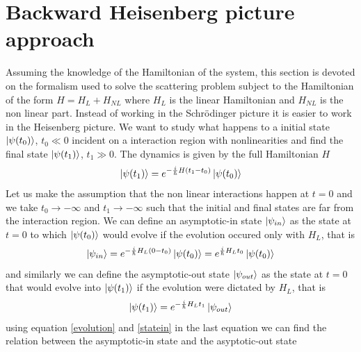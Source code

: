 \documentclass[12pt]{book}
\begin{document}
\section{Backward Heisenberg picture approach}\label{heinsemberg}
Assuming the knowledge of the Hamiltonian of the system, this section is devoted on the formalism used to solve the scattering problem subject to the Hamiltonian of the form $H = H_L +H_{NL}$ where $H_L$ is the linear Hamiltonian and $H_{NL}$ is the non linear part. Instead of working in the Schr{\"o}dinger picture it is easier to work in the Heisenberg picture. 
We want to study what happens to a initial state $\ket{\psi(t_0)}$, $t_0\ll 0$ incident on a interaction region with nonlinearities and find the final state $\ket{\psi(t_1)}$, $t_1\gg 0$. The dynamics is given by the full Hamiltonian $H$
\begin{equation}\label{evolution}\ket{\psi(t_1)} = e^{-\frac{i}{\hbar}H (t_1-t_0)}\ket{\psi(t_0)}\end{equation}
Let us make the assumption that the non linear interactions happen at $t=0$ and we take $t_0 \to -\infty$ and $t_1 \to -\infty$ such that the initial and final states are far from the interaction region. We can define an asymptotic-in state $\ket{\psi_{in}}$ as the state at $t=0$ to which $\ket{\psi(t_0)}$ would evolve if the evolution occured only with $H_L$, that is
\begin{equation}\label{statein}\ket{\psi_{in}} = e^{-\frac{i}{\hbar}H_L (0-t_0)}\ket{\psi(t_0)} = e^{\frac{i}{\hbar}H_Lt_0}\ket{\psi(t_0)}\end{equation}
and similarly we can define the asymptotic-out state $\ket{\psi_{out}}$ as the state at $t=0$ that would evolve into $\ket{\psi(t_1)}$ if the evolution were dictated by $H_L$, that is
\begin{equation}\ket{\psi(t_1)} = e^{-\frac{i}{\hbar}H_L t_1}\ket{\psi_{out}}\end{equation}
using equation \eqref{evolution} and \eqref{statein} in the last equation we can find the relation between the asymptotic-in state and the asyptotic-out state
\end{document}

